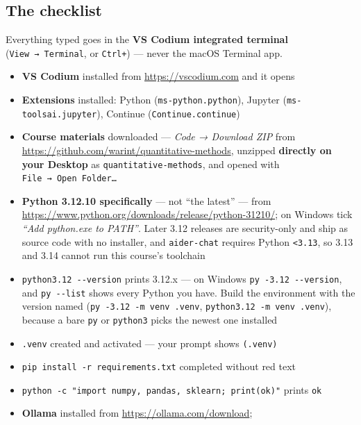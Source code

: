 \documentclass[
  letterpaper,
  10pt,
  twoside,
  openright,
  numbers=noenddot,
  chapterprefix=true]{scrbook}
\providecommand{\tightlist}{%
  \setlength{\itemsep}{0pt}\setlength{\parskip}{0pt}}
\begin{document}
\subsection{The checklist}\label{the-checklist}

Everything typed goes in the \textbf{VS Codium integrated terminal}
(\texttt{View\ →\ Terminal}, or \texttt{Ctrl+\textasciigrave{}}) ---
never the macOS Terminal app.

\begin{itemize}
\tightlist
\item[$\square$]
  \textbf{VS Codium} installed from \url{https://vscodium.com} and it
  opens
\item[$\square$]
  \textbf{Extensions} installed: Python (\texttt{ms-python.python}),
  Jupyter (\texttt{ms-toolsai.jupyter}), Continue
  (\texttt{Continue.continue})
\item[$\square$]
  \textbf{Course materials} downloaded --- \emph{Code → Download ZIP}
  from \url{https://github.com/warint/quantitative-methods}, unzipped
  \textbf{directly on your Desktop} as \texttt{quantitative-methods},
  and opened with \texttt{File\ →\ Open\ Folder…}
\item[$\square$]
  \textbf{Python 3.12.10 specifically} --- not ``the latest'' --- from
  \url{https://www.python.org/downloads/release/python-31210/}; on
  Windows tick \emph{``Add python.exe to PATH''}. Later 3.12 releases
  are security-only and ship as source code with no installer, and
  \texttt{aider-chat} requires Python \texttt{\textless{}3.13}, so 3.13
  and 3.14 cannot run this course's toolchain
\item[$\square$]
  \texttt{python3.12\ -\/-version} prints 3.12.x --- on Windows
  \texttt{py\ -3.12\ -\/-version}, and \texttt{py\ -\/-list} shows every
  Python you have. Build the environment with the version named
  (\texttt{py\ -3.12\ -m\ venv\ .venv},
  \texttt{python3.12\ -m\ venv\ .venv}), because a bare \texttt{py} or
  \texttt{python3} picks the newest one installed
\item[$\square$]
  \texttt{.venv} created and activated --- your prompt shows
  \texttt{(.venv)}
\item[$\square$]
  \texttt{pip\ install\ -r\ requirements.txt} completed without red text
\item[$\square$]
  \texttt{python\ -c\ "import\ numpy,\ pandas,\ sklearn;\ print(\textquotesingle{}ok\textquotesingle{})"}
  prints \texttt{ok}
\item[$\square$]
  \textbf{Ollama} installed from \url{https://ollama.com/download};

\end{itemize}
\end{document}
